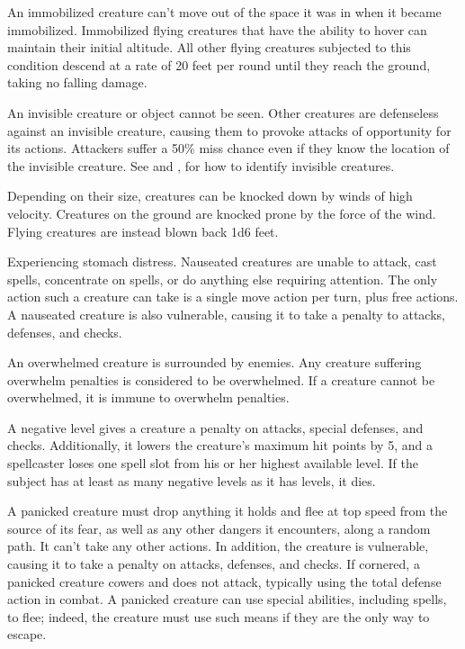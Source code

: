  An immobilized creature can't move out of the space it was in when it became immobilized. Immobilized flying creatures that have the ability to hover can maintain their initial altitude. All other flying creatures subjected to this condition descend at a rate of 20 feet per round until they reach the ground, taking no falling damage.

 An invisible creature or object cannot be seen. Other creatures are defenseless against an invisible creature, causing them to provoke attacks of opportunity for its actions. Attackers suffer a 50\% miss chance even if they know the location of the invisible creature. See  and , for how to identify invisible creatures.

 Depending on their size, creatures can be knocked down by winds of high velocity. Creatures on the ground are knocked prone by the force of the wind. Flying creatures are instead blown back 1d6  feet.

 Experiencing stomach distress. Nauseated creatures are unable to attack, cast spells, concentrate on spells, or do anything else requiring attention. The only action such a creature can take is a single move action per turn, plus free actions. A nauseated creature is also vulnerable, causing it to take a  penalty to attacks, defenses, and checks.

 An overwhelmed creature is surrounded by enemies. Any creature suffering overwhelm penalties is considered to be overwhelmed. If a creature cannot be overwhelmed, it is immune to overwhelm penalties.

 A negative level gives a creature a  penalty on attacks, special defenses, and checks. Additionally, it lowers the creature's maximum hit points by 5, and a spellcaster loses one spell slot from his or her highest available level. If the subject has at least as many negative levels as it has levels, it dies.

 A panicked creature must drop anything it holds and flee at top speed from the source of its fear, as well as any other dangers it encounters, along a random path. It can't take any other actions. In addition, the creature is vulnerable, causing it to take a  penalty on attacks, defenses, and checks. If cornered, a panicked creature cowers and does not attack, typically using the total defense action in combat. A panicked creature can use special abilities, including spells, to flee; indeed, the creature must use such means if they are the only way to escape.

